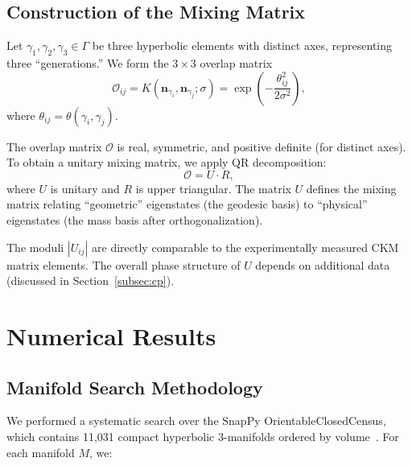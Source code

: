 \documentclass[11pt,a4paper]{article}
\begin{document}
\subsection{Construction of the Mixing Matrix}
\label{subsec:mixing}

Let $\gamma_1, \gamma_2, \gamma_3 \in \Gamma$ be three hyperbolic
elements with distinct axes, representing three ``generations.'' We
form the $3 \times 3$ overlap matrix
\begin{equation}
\mathcal{O}_{ij} = K(\mathbf{n}_{\gamma_i}, \mathbf{n}_{\gamma_j};\sigma)
= \exp\!\left(-\frac{\theta_{ij}^2}{2\sigma^2}\right),
\label{eq:overlap}
\end{equation}
where $\theta_{ij} = \theta(\gamma_i, \gamma_j)$.

The overlap matrix $\mathcal{O}$ is real, symmetric, and positive 
definite (for distinct axes). To obtain a unitary mixing matrix, we 
apply QR decomposition:
\begin{equation}
\mathcal{O} = U \cdot R,
\end{equation}
where $U$ is unitary and $R$ is upper triangular. The matrix $U$ 
defines the mixing matrix relating ``geometric'' eigenstates (the 
geodesic basis) to ``physical'' eigenstates (the mass basis after 
orthogonalization).

The moduli $|U_{ij}|$ are directly comparable to the experimentally 
measured CKM matrix elements. The overall phase structure of $U$ 
depends on additional data (discussed in Section~\ref{subsec:cp}).

\section{Numerical Results}
\label{sec:numerical}

\subsection{Manifold Search Methodology}
\label{subsec:search}

We performed a systematic search over the SnapPy OrientableClosedCensus, 
which contains 11,031 compact hyperbolic 3-manifolds ordered by 
volume~\cite{SnapPy}. For each manifold $M$, we:
\end{document}
